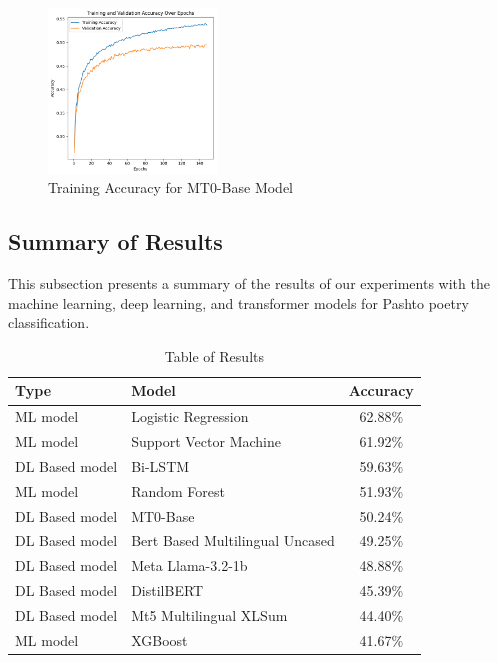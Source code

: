 \begin{figure}[H]
    \centering
    \includegraphics[width=0.4\textwidth]{mt0_trainaccuracy.png}
    \caption{Training Accuracy for MT0-Base Model}
    \label{fig:mt0_trainaccuracy}
\end{figure}


\subsection{Summary of Results}

This subsection presents a summary of the results of our experiments with the machine learning, deep learning, and transformer models for Pashto poetry classification.

\begin{table}[ht]
    \centering
    \begin{tabular}{|l|l|c|}
        \hline
        \textbf{Type} & \textbf{Model} & \textbf{Accuracy} \\
        \hline
        ML model & Logistic Regression & 62.88\% \\
        ML model & Support Vector Machine & 61.92\% \\
        DL Based model & Bi-LSTM & 59.63\% \\
        ML model & Random Forest & 51.93\% \\
        DL Based model & MT0-Base & 50.24\% \\
        DL Based model & Bert Based Multilingual Uncased & 49.25\% \\
        DL Based model & Meta Llama-3.2-1b & 48.88\% \\
        DL Based model & DistilBERT & 45.39\% \\
        DL Based model & Mt5 Multilingual XLSum & 44.40\% \\
        ML model & XGBoost & 41.67\% \\
        \hline
    \end{tabular}
    \caption{Table of Results}
    \label{tab:results}
\end{table}




